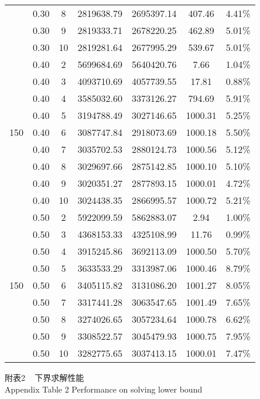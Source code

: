 {\begin{longtable}{cccrrcc}
        & 0.30  & 8     & 2819638.79 & 2695397.14 & 407.46 & 4.41\% \\
        & 0.30  & 9     & 2819333.71 & 2678220.25 & 462.89 & 5.01\% \\
        & 0.30  & 10    & 2819281.64 & 2677995.29 & 539.67 & 5.01\% \\
        & 0.40  & 2     & 5699684.69 & 5640420.76 & 7.66  & 1.04\% \\
        & 0.40  & 3     & 4093710.69 & 4057739.55 & 17.81 & 0.88\% \\
        & 0.40  & 4     & 3585032.60 & 3373126.27 & 794.69 & 5.91\% \\
        & 0.40  & 5     & 3194788.49 & 3027146.65 & 1000.31 & 5.25\% \\
  150   & 0.40  & 6     & 3087747.84 & 2918073.69 & 1000.18 & 5.50\% \\
        & 0.40  & 7     & 3035702.53 & 2880124.73 & 1000.56 & 5.12\% \\
        & 0.40  & 8     & 3029697.66 & 2875142.85 & 1000.10 & 5.10\% \\
        & 0.40  & 9     & 3020351.27 & 2877893.15 & 1000.01 & 4.72\% \\
        & 0.40  & 10    & 3024438.35 & 2866995.57 & 1000.72 & 5.21\% \\
        & 0.50  & 2     & 5922099.59 & 5862883.07 & 2.94  & 1.00\% \\
        & 0.50  & 3     & 4368153.33 & 4325108.99 & 11.76 & 0.99\% \\
        & 0.50  & 4     & 3915245.86 & 3692113.09 & 1000.50 & 5.70\% \\
        & 0.50  & 5     & 3633533.29 & 3313987.06 & 1000.46 & 8.79\% \\
  150   & 0.50  & 6     & 3405115.82 & 3131086.20 & 1001.27 & 8.05\% \\
        & 0.50  & 7     & 3317441.28 & 3063547.65 & 1001.49 & 7.65\% \\
        & 0.50  & 8     & 3274026.65 & 3057234.64 & 1000.78 & 6.62\% \\
        & 0.50  & 9     & 3308522.57 & 3045479.93 & 1000.75 & 7.95\% \\
        & 0.50  & 10    & 3282775.65 & 3037413.15 & 1000.01 & 7.47\% \\
	\bottomrule %
\end{longtable}
}


\newpage
\begin{center}
      {附表2 ~ 下界求解性能}\\
      {Appendix Table 2 Performance on solving lower bound}
      \vspace{-20pt}
\end{center}

